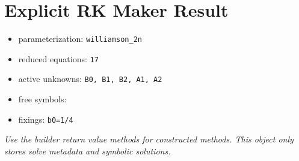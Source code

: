\documentclass{article}
\begin{document}
\section*{Explicit RK Maker Result}
\begin{itemize}
\item parameterization: \texttt{williamson_2n}
\item reduced equations: \texttt{17}
\item active unknowns: \texttt{B0, B1, B2, A1, A2}
\item free symbols: \texttt{}
\item fixings: \texttt{b0=1/4}
\end{itemize}
\textit{Use the builder return value methods for constructed methods. This object only stores solve metadata and symbolic solutions.}
\end{document}
